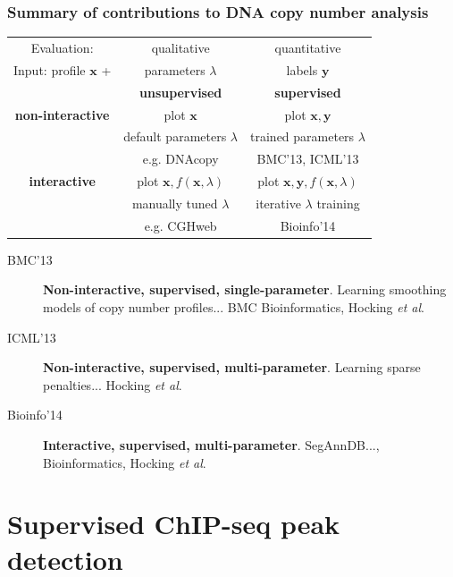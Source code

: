 \documentclass{beamer}
\begin{document}
\begin{frame}
  \frametitle{Summary of contributions to
    DNA copy number analysis}
  \begin{center}
  \begin{tabular}{c|c|c}
    Evaluation: & qualitative &  quantitative \\
    Input: profile $\mathbf x$ + & parameters $\lambda$ & labels $\mathbf y$ \\
        & \textbf{unsupervised} & \textbf{supervised}\\
    \hline
    \textbf{non-interactive}
    & plot $\mathbf x$ & plot $\mathbf x, \mathbf y$\\
    & default parameters $\lambda$ & trained parameters $\lambda$ \\
    & e.g. DNAcopy & BMC'13, ICML'13\\
    \hline
    \textbf{interactive}
    & plot $\mathbf x, f(\mathbf x, \lambda)$ 
    & plot $\mathbf x, \mathbf y, f(\mathbf x, \lambda)$\\
    & manually tuned $\lambda$ & iterative $\lambda$ training\\
    & e.g. CGHweb  & Bioinfo'14
  \end{tabular}
  \end{center}
  \begin{description}
  \item[BMC'13] \textbf{Non-interactive, supervised, single-parameter}.
    Learning smoothing models of copy number profiles... 
    BMC Bioinformatics, Hocking \textit{et al}.
  \item[ICML'13] \textbf{Non-interactive, supervised,
      multi-parameter}.  
    Learning sparse penalties... Hocking \textit{et al}.
  \item[Bioinfo'14] \textbf{Interactive, supervised, multi-parameter}.
    SegAnnDB..., Bioinformatics, Hocking \textit{et al}.
  \end{description}
\end{frame}

\section{Supervised ChIP-seq peak detection}
\end{document}
